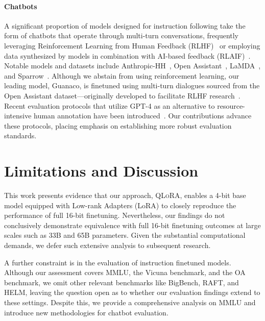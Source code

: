 \paragraph{Chatbots} A significant proportion of models designed for instruction following take the form of chatbots that operate through multi-turn conversations, frequently leveraging Reinforcement Learning from Human Feedback (RLHF)~\citep{christiano2017deep} or employing data synthesized by models in combination with AI-based feedback (RLAIF)~\citep{bai2022constitutional}. Notable models and datasets include Anthropic-HH~\citep{askell2021general,bai2022training}, Open Assistant~\citep{kopf2023openassistant}, LaMDA~\citep{thoppilan2022lamda}, and Sparrow~\citep{glaese2022improving}. Although we abstain from using reinforcement learning, our leading model, Guanaco, is finetuned using multi-turn dialogues sourced from the Open Assistant dataset—originally developed to facilitate RLHF research~\citep{kopf2023openassistant}. Recent evaluation protocols that utilize GPT-4 as an alternative to resource-intensive human annotation have been introduced~\citep{vicuna2023,peng2023instruction}. Our contributions advance these protocols, placing emphasis on establishing more robust evaluation standards.

\section{Limitations and Discussion}

This work presents evidence that our approach, \textsc{QLoRA}, enables a 4-bit base model equipped with Low-rank Adapters (LoRA) to closely reproduce the performance of full 16-bit finetuning. Nevertheless, our findings do not conclusively demonstrate equivalence with full 16-bit finetuning outcomes at large scales such as 33B and 65B parameters. Given the substantial computational demands, we defer such extensive analysis to subsequent research.

A further constraint is in the evaluation of instruction finetuned models. Although our assessment covers MMLU, the Vicuna benchmark, and the OA benchmark, we omit other relevant benchmarks like BigBench, RAFT, and HELM, leaving the question open as to whether our evaluation findings extend to these settings. Despite this, we provide a comprehensive analysis on MMLU and introduce new methodologies for chatbot evaluation.

